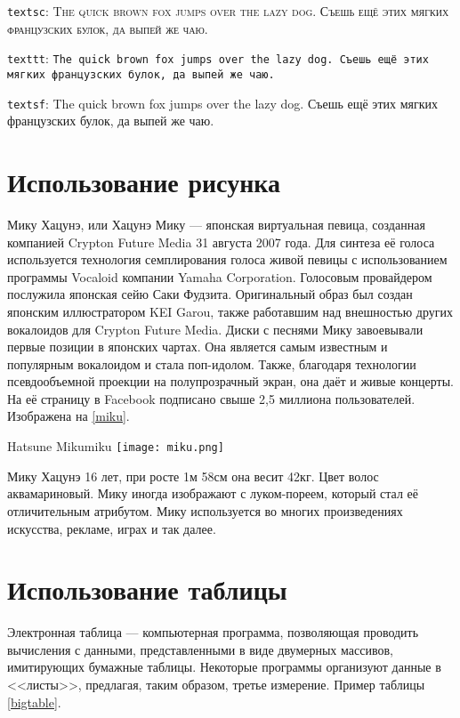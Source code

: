 \documentclass{universityreport}
\begin{document}
\texttt{textsc}: \textsc{The quick brown fox jumps over the lazy dog. Съешь ещё этих мягких французских булок, да выпей же чаю.}

\texttt{texttt}: \texttt{The quick brown fox jumps over the lazy dog. Съешь ещё этих мягких французских булок, да выпей же чаю.}

\texttt{textsf}: \textsf{The quick brown fox jumps over the lazy dog. Съешь ещё этих мягких французских булок, да выпей же чаю.}

\section{Использование рисунка}

Мику Хацунэ, или Хацунэ Мику --- японская виртуальная певица, созданная компанией Crypton Future Media 31 августа 2007 года. Для синтеза её голоса используется технология семплирования голоса живой певицы с использованием программы Vocaloid компании Yamaha Corporation. Голосовым провайдером послужила японская сейю Саки Фудзита. Оригинальный образ был создан японским иллюстратором KEI Garou, также работавшим над внешностью других вокалоидов для Crypton Future Media. Диски с песнями Мику завоевывали первые позиции в японских чартах. Она является самым известным и популярным вокалоидом и стала поп-идолом. Также, благодаря технологии псевдообъемной проекции на полупрозрачный экран, она даёт и живые концерты. На её страницу в Facebook подписано свыше 2,5 миллиона пользователей. Изображена на \ref{miku}.

\begin{gostimage}{Hatsune Miku}{miku}
	\texttt{[image: miku.png]}
\end{gostimage}

Мику Хацунэ 16 лет, при росте 1м 58см она весит 42кг. Цвет волос аквамариновый. Мику иногда изображают с луком-пореем, который стал её отличительным атрибутом. Мику используется во многих произведениях искусства, рекламе, играх и так далее.

\section{Использование таблицы}

Электронная таблица --- компьютерная программа, позволяющая проводить вычисления с данными, представленными в виде двумерных массивов, имитирующих бумажные таблицы. Некоторые программы организуют данные в <<листы>>, предлагая, таким образом, третье измерение. Пример таблицы \ref{bigtable}.
\end{document}
